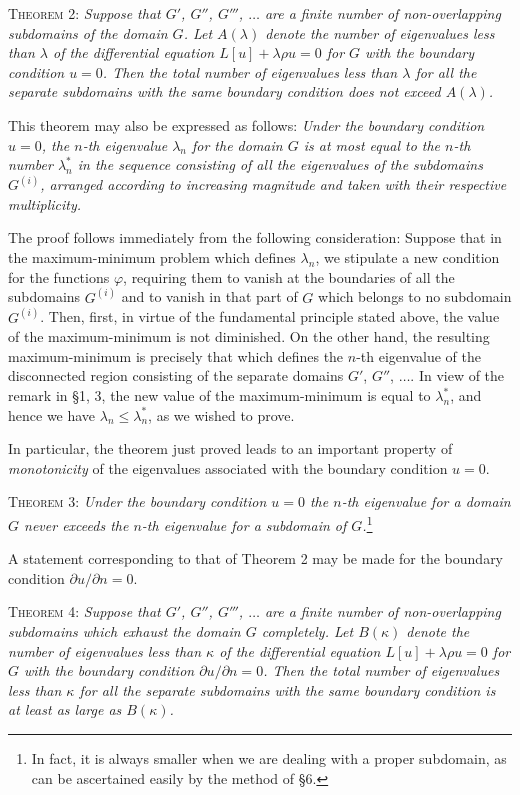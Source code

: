 \textsc{Theorem 2:} \emph{Suppose that $G'$, $G''$, $G'''$, $\ldots$ are a finite number of non-overlapping subdomains of the domain $G$. Let $A(\lambda)$ denote the number of eigenvalues less than $\lambda$ of the differential equation $L[u]+\lambda\rho u=0$ for $G$ with the boundary condition $u=0$. Then the total number of eigenvalues less than $\lambda$ for all the separate subdomains with the same boundary condition does not exceed $A(\lambda)$.}

This theorem may also be expressed as follows: \emph{Under the boundary condition $u=0$, the $n$-th eigenvalue $\lambda_n$ for the domain $G$ is at most equal to the $n$-th number $\lambda_n^*$ in the sequence consisting of all the eigenvalues of the subdomains $G^{(i)}$, arranged according to increasing magnitude and taken with their respective multiplicity.}

The proof follows immediately from the following consideration: Suppose that in the maximum-minimum problem which defines $\lambda_n$, we stipulate a new condition for the functions $\varphi$, requiring them to vanish at the boundaries of all the subdomains $G^{(i)}$ and to vanish in that part of $G$ which belongs to no subdomain $G^{(i)}$. Then, first, in virtue of the fundamental principle stated above, the value of the maximum-minimum is not diminished. On the other hand, the resulting maximum-minimum is precisely that which defines the $n$-th eigenvalue of the disconnected region consisting of the separate domains $G'$, $G''$, $\ldots$. In view of the remark in \S1, 3, the new value of the maximum-minimum is equal to $\lambda_n^*$, and hence we have $\lambda_n\le\lambda_n^*$, as we wished to prove.

In particular, the theorem just proved leads to an important property of \emph{monotonicity} of the eigenvalues associated with the boundary condition $u=0$.

\textsc{Theorem 3:} \emph{Under the boundary condition $u=0$ the $n$-th eigenvalue for a domain $G$ never exceeds the $n$-th eigenvalue for a subdomain of $G$.}\footnote{In fact, it is always smaller when we are dealing with a proper subdomain, as can be ascertained easily by the method of \S6.}

A statement corresponding to that of Theorem 2 may be made for the boundary condition $\partial u/\partial n=0$.

\textsc{Theorem 4:} \emph{Suppose that $G'$, $G''$, $G'''$, $\ldots$ are a finite number of non-overlapping subdomains which exhaust the domain $G$ completely. Let $B(\kappa)$ denote the number of eigenvalues less than $\kappa$ of the differential equation $L[u]+\lambda\rho u=0$ for $G$ with the boundary condition $\partial u/\partial n=0$. Then the total number of eigenvalues less than $\kappa$ for all the separate subdomains with the same boundary condition is at least as large as $B(\kappa)$.}

